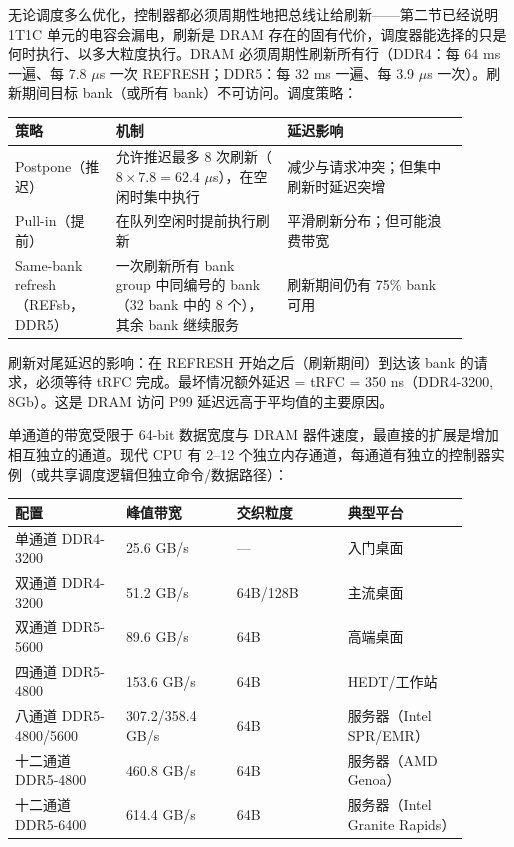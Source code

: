 

无论调度多么优化，控制器都必须周期性地把总线让给刷新——第二节已经说明 1T1C 单元的电容会漏电，刷新是 DRAM 存在的固有代价，调度器能选择的只是何时执行、以多大粒度执行。DRAM 必须周期性刷新所有行（DDR4：每 64 ms 一遍、每 7.8 $\mu$s 一次 REFRESH；DDR5：每 32 ms 一遍、每 3.9 $\mu$s 一次）。刷新期间目标 bank（或所有 bank）不可访问。调度策略：

\begin{longtable}{L{0.2\linewidth}L{0.34\linewidth}L{0.36\linewidth}}
\toprule
策略 & 机制 & 延迟影响 \\
\midrule
Postpone（推迟） & 允许推迟最多 8 次刷新（$8 \times 7.8 = 62.4$ $\mu$s），在空闲时集中执行 & 减少与请求冲突；但集中刷新时延迟突增 \\\tablerowrule
Pull-in（提前） & 在队列空闲时提前执行刷新 & 平滑刷新分布；但可能浪费带宽 \\\tablerowrule
Same-bank refresh（REFsb，DDR5） & 一次刷新所有 bank group 中同编号的 bank（32 bank 中的 8 个），其余 bank 继续服务 & 刷新期间仍有 75\% bank 可用 \\
\bottomrule
\end{longtable}


刷新对尾延迟的影响：在 REFRESH 开始之后（刷新期间）到达该 bank 的请求，必须等待 tRFC 完成。最坏情况额外延迟 = tRFC = 350 ns（DDR4-3200, 8Gb）。这是 DRAM 访问 P99 延迟远高于平均值的主要原因。


单通道的带宽受限于 64-bit 数据宽度与 DRAM 器件速度，最直接的扩展是增加相互独立的通道。现代 CPU 有 2--12 个独立内存通道，每通道有独立的控制器实例（或共享调度逻辑但独立命令/数据路径）：

\begin{longtable}{L{0.22\linewidth}L{0.22\linewidth}L{0.22\linewidth}L{0.24\linewidth}}
\toprule
配置 & 峰值带宽 & 交织粒度 & 典型平台 \\
\midrule
单通道 DDR4-3200 & 25.6 GB/s & — & 入门桌面 \\\tablerowrule
双通道 DDR4-3200 & 51.2 GB/s & 64B/128B & 主流桌面 \\\tablerowrule
双通道 DDR5-5600 & 89.6 GB/s & 64B & 高端桌面 \\\tablerowrule
四通道 DDR5-4800 & 153.6 GB/s & 64B & HEDT/工作站 \\\tablerowrule
八通道 DDR5-4800/5600 & 307.2/358.4 GB/s & 64B & 服务器（Intel SPR/EMR） \\\tablerowrule
十二通道 DDR5-4800 & 460.8 GB/s & 64B & 服务器（AMD Genoa） \\\tablerowrule
十二通道 DDR5-6400 & 614.4 GB/s & 64B & 服务器（Intel Granite Rapids） \\
\bottomrule
\end{longtable}


